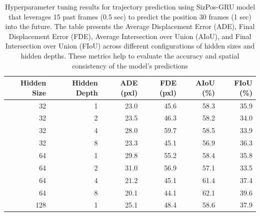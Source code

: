 \documentclass[12pt,oneside]{book} %
\begin{document}
\begin{table}[H]
    \centering
    \caption{Hyperparameter tuning results for trajectory prediction using SizPos-GRU model that leverages 15 past frames (0.5 sec) to predict the position 30 frames (1 sec) into the future. The table presents the Average Displacement Error (ADE), Final Displacement Error (FDE), Average Intersection over Union (AIoU), and Final Intersection over Union (FIoU) across different configurations of hidden sizes and hidden depths. These metrics help to evaluate the accuracy and spatial consistency of the model’s predictions}
    \begin{adjustbox}{width=0.6\textwidth}
        \begin{tabular}{rrrrrr}
            \toprule
            \textbf{Hidden Size} & \textbf{Hidden Depth} & \textbf{ADE (pxl)} & \textbf{FDE (pxl)} & \textbf{AIoU (\%)} & \textbf{FIoU (\%)} \\ 
            \midrule
            32                   & 1                     & 23.0               & 45.6               & 58.3               & 35.9               \\
            32                   & 2                     & 23.5               & 46.3               & 58.2               & 34.0               \\
            32                   & 4                     & 28.0               & 59.7               & 58.5               & 33.9               \\
            32                   & 8                     & 23.3               & 45.1               & 56.9               & 36.3               \\
            64                   & 1                     & 29.8               & 55.2               & 58.4               & 35.8               \\
            64                   & 2                     & 31.0               & 56.9               & 57.1               & 33.5               \\
            64                   & 4                     & 21.2               & 45.1               & 61.4               & 37.4               \\
            64                   & 8                     & 20.1               & 44.1               & 62.1               & 39.6               \\
            128                  & 1                     & 25.1               & 48.4               & 58.6               & 37.9               \\

\end{tabular}
\end{adjustbox}
\end{table}
\end{document}

